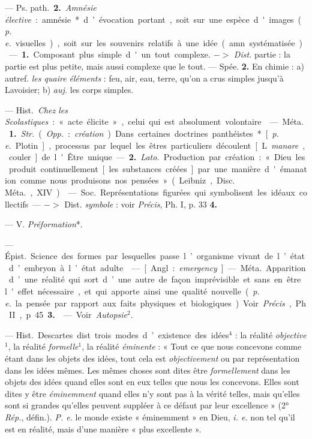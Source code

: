 \begin{itemize}[leftmargin=1cm, label=, itemsep=1pt]
— \si{Ps. path.} {\bf 2.} {\it Amnésie élective} :
amnésie* d’évocation portant, soit sur une espèce d'images
({\it p. e.} visuelles), soit sur les souvenirs relatifs
à une idée (amn. systématisée).

 — {\bf 1.} Composant plus simple
d'un tout complexe. $->$ {\it Dist.}
partie : la partie est plus petite,
mais aussi complexe que le tout. —
Spée. {\bf 2.} En chimie : a) autref. {\it les
quaire éléments} : feu, air, eau, terre,
qu’on a crus simples jusqu’à Lavoisier; b)  {\it auj.} les corps simples.

 — \si{Hist.} {\it Chez les Scolastiques} :
« acte élicite », celui qui est absolument volontaire.

 — \si{Méta.} {\bf 1.} {\it Str.} ({\it Opp.} :
{\it création}). Dans certaines doctrines
panthéistes* [{\it p. e.} Plotin], processus
par lequel les êtres particuliers
découlent [L. {\it manare}, couler] de
l'Être unique. — {\bf 2.} {\it Lato.} Production par création :
« Dieu les produit continuellement [les substances
créées] par une manière d'émanation comme nous produisons nos
pensées» (Leibniz, \si{Disc. Méta.}, XIV).

 — \si{Soc.} Représentations
figurées qui symbolisent les idéaux
collectifs. — $->$ Dist. {\it symbole} :
voir  {\it Précis}, Ph. I, p. 33 {\bf 4.}

 — V. {\it Préformation}*.

 — \si{Épist.} Science des
formes par lesquelles passe l’organisme vivant de l’état d’embryon à
l’état adulte.

 — [Angl. : {\it emergency}] —
\si{Méta.} Apparition d’une réalité qui
sort d’une autre de façon imprévisible et sans en être l'effet
nécessaire, et qui apporte ainsi une qualité nouvelle ({\it p. e.}
la pensée par rapport aux faits physiques et biologiques). Voir
{\it Précis}, Ph. II, p. 45 {\bf 3.}

 — Voir {\it Autopsie}$^2$.

 — \si{Hist.} Descartes dist. trois
modes d’existence des idées$^4$ : la
réalité {\it objective}$^1$, la réalité {\it formelle}$^1$,
la réalité {\it éminente} : « Tout ce que
nous concevons comme étant dans
les objets des idées, tout cela est
{\it objectivement} ou par représentation
dans les idées mêmes. Les mêmes
choses sont dites être {\it formellement}
dans les objets des idées quand elles
sont en eux telles que nous les concevons. Elles sont dites y être
{\it éminemment} quand elles n’y sont pas
à la vérité telles, mais qu’elles sont
si grandes qu’elles peuvent suppléer
à ce défaut par leur excellence »
(2° {\it Rép.}, défin.). {\it P. e.} le monde existe
« éminemment » en Dieu, {\it i. e.} non
tel qu’il est en réalité, mais d’une
manière « plus excellente ».


\end{itemize}
